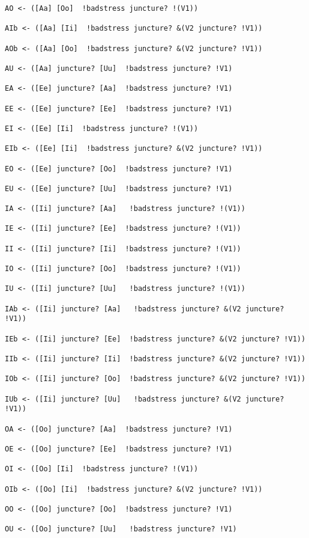 \documentclass[12pt]{book}
\begin{document}
{\begin{verbatim}
AO <- ([Aa] [Oo]  !badstress juncture? !(V1)) 

AIb <- ([Aa] [Ii]  !badstress juncture? &(V2 juncture? !V1))  

AOb <- ([Aa] [Oo]  !badstress juncture? &(V2 juncture? !V1))  
 
AU <- ([Aa] juncture? [Uu]  !badstress juncture? !V1)  

EA <- ([Ee] juncture? [Aa]  !badstress juncture? !V1)  

EE <- ([Ee] juncture? [Ee]  !badstress juncture? !V1)  

EI <- ([Ee] [Ii]  !badstress juncture? !(V1)) 

EIb <- ([Ee] [Ii]  !badstress juncture? &(V2 juncture? !V1))  

EO <- ([Ee] juncture? [Oo]  !badstress juncture? !V1)  

EU <- ([Ee] juncture? [Uu]  !badstress juncture? !V1)  

IA <- ([Ii] juncture? [Aa]   !badstress juncture? !(V1))  

IE <- ([Ii] juncture? [Ee]  !badstress juncture? !(V1))  

II <- ([Ii] juncture? [Ii]  !badstress juncture? !(V1))  

IO <- ([Ii] juncture? [Oo]  !badstress juncture? !(V1))  

IU <- ([Ii] juncture? [Uu]   !badstress juncture? !(V1)) 

IAb <- ([Ii] juncture? [Aa]   !badstress juncture? &(V2 juncture? !V1))  

IEb <- ([Ii] juncture? [Ee]  !badstress juncture? &(V2 juncture? !V1))  

IIb <- ([Ii] juncture? [Ii]  !badstress juncture? &(V2 juncture? !V1))  

IOb <- ([Ii] juncture? [Oo]  !badstress juncture? &(V2 juncture? !V1))  

IUb <- ([Ii] juncture? [Uu]   !badstress juncture? &(V2 juncture? !V1))   

OA <- ([Oo] juncture? [Aa]  !badstress juncture? !V1)  

OE <- ([Oo] juncture? [Ee]  !badstress juncture? !V1)  

OI <- ([Oo] [Ii]  !badstress juncture? !(V1)) 

OIb <- ([Oo] [Ii]  !badstress juncture? &(V2 juncture? !V1)) 

OO <- ([Oo] juncture? [Oo]  !badstress juncture? !V1)  

OU <- ([Oo] juncture? [Uu]   !badstress juncture? !V1)  


\end{verbatim}}
\end{document}
